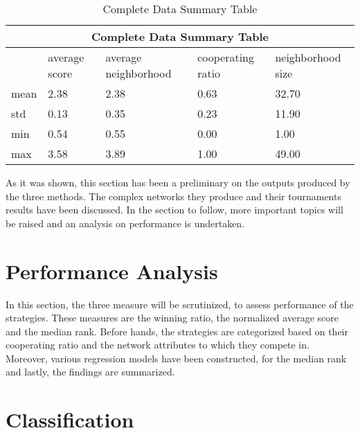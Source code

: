 \begin{table}[!hbtp]
	\centering
	\begin{adjustbox}{width=0.8\textwidth}
		\small
		\begin{tabular}{|l|l|l|l|l|}
			\hline
			\multicolumn{5}{|c|}{Complete Data Summary Table}                                      \\ \hline
			     & average score & average neighborhood & cooperating ratio & neighborhood size \\ \hline
			mean & 2.38          & 2.38                 & 0.63              & 32.70             \\ \hline
			std  & 0.13          & 0.35                 & 0.23              & 11.90             \\ \hline
			min  & 0.54          & 0.55                 & 0.00              & 1.00              \\ \hline
			max  & 3.58          & 3.89                 & 1.00              & 49.00             \\ \hline
		\end{tabular}
	\end{adjustbox}
	\caption{Complete Data Summary Table}
	\label{table:summary-complete-data}
\end{table}

As it was shown, this section has been a preliminary on the outputs produced by
the three methods. The complex networks they produce and their tournaments
results have been discussed. In the section to follow, more important topics will
be raised and an analysis on performance is undertaken.

\section{Performance Analysis}
\label{performance-analysis}
In this section, the three measure will be scrutinized, to assess performance of the
strategies. These measures are the winning ratio, the normalized average score
and the median rank. Before hands, the strategies are categorized based on their
cooperating ratio and the network attributes to which they compete in. Moreover,
various regression models have been constructed, for the median rank and lastly,
the findings are summarized.

\section{Classification}
\label{sub:four-classification}


